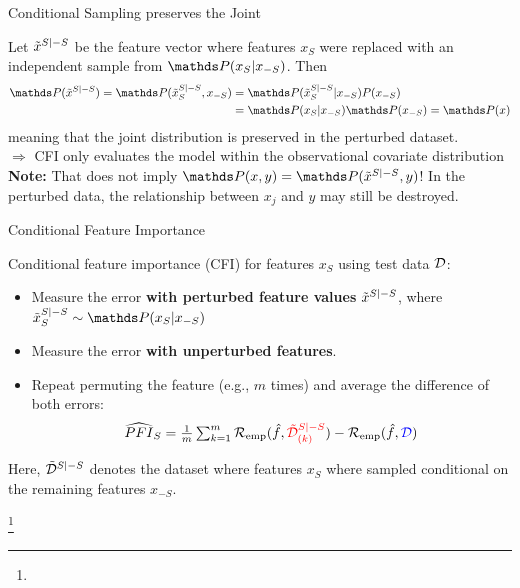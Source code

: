 \documentclass[11pt,compress,t,notes=noshow, xcolor=table]{beamer}
\begin{document}
 
 \begin{vbframe}{Conditional Sampling preserves the Joint}
 
 Let $\pert{x}{S}{-S}$ be the feature vector where features $x_S$ were replaced with an independent sample from $\P(x_S|x_{-S})$. Then
%
\begin{align*}
  \P(\pert{x}{S}{-S}) = \P(\pert{x}{S}{-S}_S, x_{-S}) &= \P(\pert{x}{S}{-S}_S|x_{-S}) P(x_{-S})\\
   &= \P(x_S|x_{-S}) \P(x_{-S}) = \P(x)
\end{align*}
 meaning that the joint distribution is preserved in the perturbed dataset.\\
 $\Rightarrow$ CFI only evaluates the model within the observational covariate distribution\\
 \lz
 \textbf{Note:} That does not imply $\P(x,y) = \P(\pert{x}{S}{-S}, y)$! In the perturbed data, the relationship between $x_j$ and $y$ may still be destroyed.\\
 \end{vbframe}



\begin{vbframe}{Conditional Feature Importance}
\normalsize

Conditional feature importance (CFI) for features $x_S$ using test data $\D$:
\begin{itemize}
  \item Measure the error \color{red}\textbf{with perturbed feature values} \color{black} $\pert{x}{S}{-S}$, where $\pert{x}{S}{-S}_S \sim \P(x_S|x_{-S})$
  \item Measure the error \color{blue}\textbf{with unperturbed features}\color{black}.
  \item Repeat permuting the feature (e.g., $m$ times) and average the difference of both errors: 
$$\widehat{PFI}_S = \tfrac{1}{m} \textstyle\sum\nolimits_{k = 1}^{m} \riske (\fh, {\color{red}\pert{\D}{S}{-S}_{(k)}}) - \riske (\fh, {\color{blue}\D})$$
\end{itemize}

Here, $\pert{\D}{S}{-S}$ denotes the dataset where features $x_S$ where sampled conditional on the remaining features $x_{-S}$.

\footnote[frame]{}

\end{vbframe}
\end{document}
